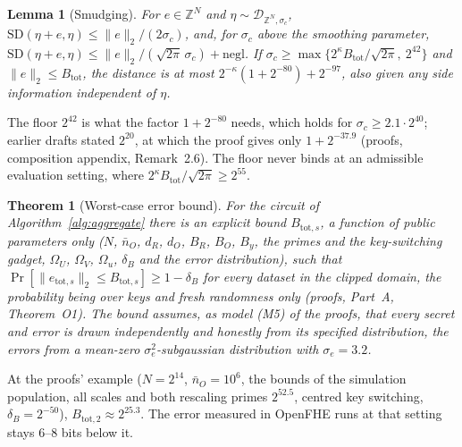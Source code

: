\documentclass[11pt]{article}
\theoremstyle{definition}
\theoremstyle{plain}
\newtheorem{theorem}{Theorem}[section]
\newtheorem{lemma}{Lemma}[section]
\newcommand{\Z}{\mathbb{Z}}
\begin{document}
\begin{lemma}[Smudging]
\label{lem:smudge}
For $e \in \Z^N$ and $\eta \sim \mathcal D_{\Z^N, \sigma_c}$, $\mathrm{SD}(\eta + e, \eta) \le \|e\|_2/(2\sigma_c)$, and, for $\sigma_c$ above the smoothing parameter, $\mathrm{SD}(\eta + e, \eta) \le \|e\|_2/(\sqrt{2\pi}\,\sigma_c) + \mathrm{negl}$. If $\sigma_c \ge \max\{2^{\kappa}B_{\mathrm{tot}}/\sqrt{2\pi},\ 2^{42}\}$ and $\|e\|_2 \le B_{\mathrm{tot}}$, the distance is at most $2^{-\kappa}(1 + 2^{-80}) + 2^{-97}$, also given any side information independent of $\eta$.
\end{lemma}

The floor $2^{42}$ is what the factor $1 + 2^{-80}$ needs, which holds for $\sigma_c \ge 2.1 \cdot 2^{40}$; earlier drafts stated $2^{20}$, at which the proof gives only $1 + 2^{-37.9}$ (proofs, composition appendix, Remark~2.6). The floor never binds at an admissible evaluation setting, where $2^{\kappa}B_{\mathrm{tot}}/\sqrt{2\pi} \ge 2^{55}$.

\begin{theorem}[Worst-case error bound]
\label{thm:btot}
For the circuit of Algorithm~\ref{alg:aggregate} there is an explicit bound $B_{\mathrm{tot},s}$, a function of public parameters only ($N$, $\bar n_O$, $d_R$, $d_O$, $B_R$, $B_O$, $B_y$, the primes and the key-switching gadget, $\Omega_U$, $\Omega_V$, $\Omega_u$, $\delta_B$ and the error distribution), such that $\Pr[\|e_{\mathrm{tot},s}\|_2 \le B_{\mathrm{tot},s}] \ge 1 - \delta_B$ for every dataset in the clipped domain, the probability being over keys and fresh randomness only (proofs, Part~A, Theorem~O1). The bound assumes, as model (M5) of the proofs, that every secret and error is drawn independently and honestly from its specified distribution, the errors from a mean-zero $\sigma_e^2$-subgaussian distribution with $\sigma_e = 3.2$.
\end{theorem}

At the proofs' example ($N = 2^{14}$, $\bar n_O = 10^6$, the bounds of the simulation population, all scales and both rescaling primes $2^{52.5}$, centred key switching, $\delta_B = 2^{-50}$), $B_{\mathrm{tot},2} \approx 2^{25.3}$. The error measured in OpenFHE runs at that setting stays $6$--$8$ bits below it.
\end{document}
